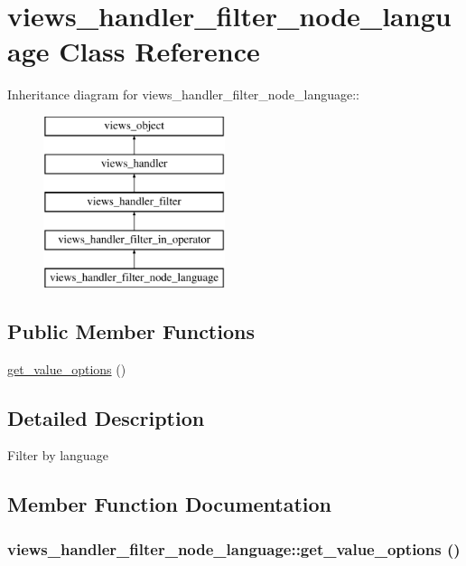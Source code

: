 \hypertarget{classviews__handler__filter__node__language}{
\section{views\_\-handler\_\-filter\_\-node\_\-language Class Reference}
\label{classviews__handler__filter__node__language}
}
Inheritance diagram for views\_\-handler\_\-filter\_\-node\_\-language::\begin{figure}[H]
\begin{center}
\leavevmode
\includegraphics[height=5cm]{classviews__handler__filter__node__language}
\end{center}
\end{figure}
\subsection*{Public Member Functions}
\begin{CompactItemize}
\item 
\hyperlink{classviews__handler__filter__node__language_fa97fc909a4394a9a69cd02e952afb66}{get\_\-value\_\-options} ()
\end{CompactItemize}


\subsection{Detailed Description}
Filter by language 

\subsection{Member Function Documentation}
\hypertarget{classviews__handler__filter__node__language_fa97fc909a4394a9a69cd02e952afb66}{
\subsubsection[{get\_\-value\_\-options}]{\setlength{\rightskip}{0pt plus 5cm}views\_\-handler\_\-filter\_\-node\_\-language::get\_\-value\_\-options ()}}
\label{classviews__handler__filter__node__language_fa97fc909a4394a9a69cd02e952afb66}


